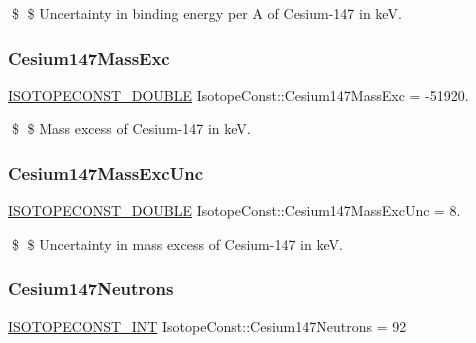 \$ \$ Uncertainty in binding energy per A of Cesium-\/147 in keV. \mbox{\label{group___isotope_const-_cesium-_cs147_ga31bdcfc11c750ce90202ba82a3f59615}} 
\subsubsection{\texorpdfstring{Cesium147\+Mass\+Exc}{Cesium147MassExc}}
{\footnotesize\ttfamily \mbox{\hyperlink{group___isotope_const-_macros_ga8f45a7272ce02c0b4c65c44636ed719a}{I\+S\+O\+T\+O\+P\+E\+C\+O\+N\+S\+T\+\_\+\+D\+O\+U\+B\+LE}} Isotope\+Const\+::\+Cesium147\+Mass\+Exc = -\/51920.}

\$ \$ Mass excess of Cesium-\/147 in keV. \mbox{\label{group___isotope_const-_cesium-_cs147_ga306b315117e6e05ff72ec6803461bda5}} 
\subsubsection{\texorpdfstring{Cesium147\+Mass\+Exc\+Unc}{Cesium147MassExcUnc}}
{\footnotesize\ttfamily \mbox{\hyperlink{group___isotope_const-_macros_ga8f45a7272ce02c0b4c65c44636ed719a}{I\+S\+O\+T\+O\+P\+E\+C\+O\+N\+S\+T\+\_\+\+D\+O\+U\+B\+LE}} Isotope\+Const\+::\+Cesium147\+Mass\+Exc\+Unc = 8.}

\$ \$ Uncertainty in mass excess of Cesium-\/147 in keV. \mbox{\label{group___isotope_const-_cesium-_cs147_gabbcb56b566934b3c788625c9cc69043b}} 
\subsubsection{\texorpdfstring{Cesium147\+Neutrons}{Cesium147Neutrons}}
{\footnotesize\ttfamily \mbox{\hyperlink{group___isotope_const-_macros_ga5f18360b3e99483a35c32d789e62621c}{I\+S\+O\+T\+O\+P\+E\+C\+O\+N\+S\+T\+\_\+\+I\+NT}} Isotope\+Const\+::\+Cesium147\+Neutrons = 92}

